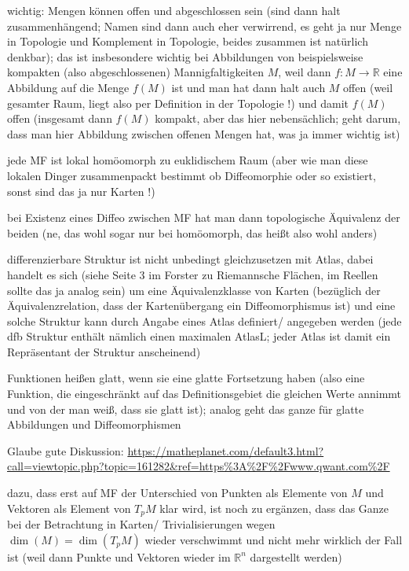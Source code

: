 wichtig: Mengen können offen und abgeschlossen sein (sind dann halt zusammenhängend; Namen sind dann auch eher verwirrend, es geht ja nur Menge in Topologie und Komplement in Topologie, beides zusammen ist natürlich denkbar); das ist insbesondere wichtig bei Abbildungen von beispielsweise kompakten (also abgeschlossenen) Mannigfaltigkeiten $M$, weil dann $f: M \rightarrow \mathbb{R}$ eine Abbildung auf die Menge $f(M)$ ist und man hat dann halt auch $M$ offen (weil gesamter Raum, liegt also per Definition in der Topologie !) und damit $f(M)$ offen (insgesamt dann $f(M)$ kompakt, aber das hier nebensächlich; geht darum, dass man hier Abbildung zwischen offenen Mengen hat, was ja immer wichtig ist)


jede MF ist lokal homöomorph zu euklidischem Raum (aber wie man diese lokalen Dinger zusammenpackt bestimmt ob Diffeomorphie oder so existiert, sonst sind das ja nur Karten !)


bei Existenz eines Diffeo zwischen MF hat man dann topologische Äquivalenz der beiden (ne, das wohl sogar nur bei homöomorph, das heißt also wohl anders)


differenzierbare Struktur ist nicht unbedingt gleichzusetzen mit Atlas, dabei handelt es sich (siehe Seite 3 im Forster zu Riemannsche Flächen, im Reellen sollte das ja analog sein) um eine Äquivalenzklasse von Karten (bezüglich der Äquivalenzrelation, dass der Kartenübergang ein Diffeomorphismus ist) und eine solche Struktur kann durch Angabe eines Atlas definiert/ angegeben werden (jede dfb Struktur enthält nämlich einen maximalen AtlasL; jeder Atlas ist damit ein Repräsentant der Struktur anscheinend)


Funktionen heißen glatt, wenn sie eine glatte Fortsetzung haben (also eine Funktion, die eingeschränkt auf das Definitionsgebiet die gleichen Werte annimmt und von der man weiß, dass sie glatt ist); analog geht das ganze für glatte Abbildungen und Diffeomorphismen


Glaube gute Diskussion: \url{https://matheplanet.com/default3.html?call=viewtopic.php?topic=161282\&ref=https\%3A\%2F\%2Fwww.qwant.com\%2F}

dazu, dass erst auf MF der Unterschied von Punkten als Elemente von $M$ und Vektoren als Element von $T_p M$ klar wird, ist noch zu ergänzen, dass das Ganze bei der Betrachtung in Karten/ Trivialisierungen wegen $\dim(M) = \dim(T_p M)$ wieder verschwimmt und nicht mehr wirklich der Fall ist (weil dann Punkte und Vektoren wieder im $\mathbb{R}^n$ dargestellt werden)


